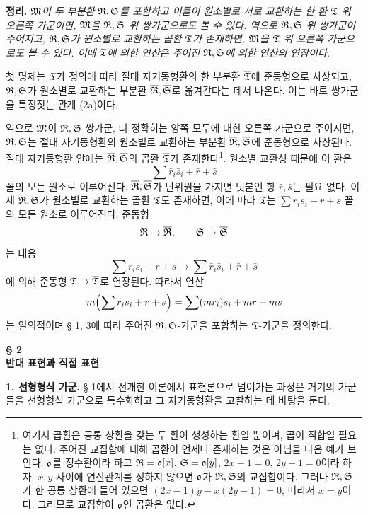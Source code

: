 \noindent\textbf{정리.} \emph{\(\mathfrak M\)이 두 부분환 \(\mathfrak R,\mathfrak S\)를 포함하고 이들이 원소별로 서로 교환하는 한 환 \(\mathfrak T\) 위 오른쪽 가군이면, \(\mathfrak M\)을 \(\mathfrak R,\mathfrak S\) 위 쌍가군으로도 볼 수 있다. 역으로 \(\mathfrak R,\mathfrak S\) 위 쌍가군이 주어지고, \(\mathfrak R,\mathfrak S\)가 원소별로 교환하는 곱환 \(\mathfrak T\)가 존재하면, \(\mathfrak M\)을 \(\mathfrak T\) 위 오른쪽 가군으로도 볼 수 있다. 이때 \(\mathfrak T\)에 의한 연산은 주어진 \(\mathfrak R,\mathfrak S\)에 의한 연산의 연장이다.}

첫 명제는 \(\mathfrak T\)가 정의에 따라 절대 자기동형환의 한 부분환 \(\overline{\mathfrak T}\)에 준동형으로 사상되고, \(\mathfrak R,\mathfrak S\)가 원소별로 교환하는 부분환 \(\overline{\mathfrak R},\overline{\mathfrak S}\)로 옮겨간다는 데서 나온다. 이는 바로 쌍가군을 특징짓는 관계 (2a)이다.

역으로 \(\mathfrak M\)이 \(\mathfrak R,\mathfrak S\)-쌍가군, 더 정확히는 양쪽 모두에 대한 오른쪽 가군으로 주어지면, \(\mathfrak R,\mathfrak S\)는 절대 자기동형환의 원소별로 교환하는 부분환 \(\overline{\mathfrak R},\overline{\mathfrak S}\)에 준동형으로 사상된다. 절대 자기동형환 안에는 \(\overline{\mathfrak R},\overline{\mathfrak S}\)의 곱환 \(\overline{\mathfrak T}\)가 존재한다\footnote{여기서 곱환은 공통 상환을 갖는 두 환이 생성하는 환일 뿐이며, 곱이 직합일 필요는 없다. 주어진 교집합에 대해 곱환이 언제나 존재하는 것은 아님을 다음 예가 보인다. \(\mathfrak o\)를 정수환이라 하고 \(\mathfrak R=\mathfrak o[x]\), \(\mathfrak S=\mathfrak o[y]\), \(2x-1=0\), \(2y-1=0\)이라 하자. \(x,y\) 사이에 연산관계를 정하지 않으면 \(\mathfrak o\)가 \(\mathfrak R,\mathfrak S\)의 교집합이다. 그러나 \(\mathfrak R,\mathfrak S\)가 한 공통 상환에 들어 있으면 \((2x-1)y-x(2y-1)=0\), 따라서 \(x=y\)이다. 그러므로 교집합이 \(\mathfrak o\)인 곱환은 없다.}. 원소별 교환성 때문에 이 환은
\[
\sum \bar r_i\bar s_i+\bar r+\bar s
\]
꼴의 모든 원소로 이루어진다. \(\overline{\mathfrak R},\overline{\mathfrak S}\)가 단위원을 가지면 덧붙인 항 \(\bar r,\bar s\)는 필요 없다. 이제 \(\mathfrak R,\mathfrak S\)가 원소별로 교환하는 곱환 \(\mathfrak T\)도 존재하면, 이에 따라 \(\mathfrak T\)는 \(\sum r_i s_i+r+s\) 꼴의 모든 원소로 이루어진다. 준동형
\[
\mathfrak R\to\overline{\mathfrak R},\qquad
\mathfrak S\to\overline{\mathfrak S}
\]
는 대응
\[
\sum r_i s_i+r+s
\longmapsto
\sum\bar r_i\bar s_i+\bar r+\bar s
\]
에 의해 준동형 \(\mathfrak T\to\overline{\mathfrak T}\)로 연장된다. 따라서 연산
\[
m\Bigl(\sum r_i s_i+r+s\Bigr)
=\sum(mr_i)s_i+mr+ms
\]
는 일의적이며 § 1, 3에 따라 주어진 \(\mathfrak R,\mathfrak S\)-가군을 포함하는 \(\mathfrak T\)-가군을 정의한다.

\begin{center}
\textbf{§ 2}\\[0.4em]
\textbf{반대 표현과 직접 표현}
\end{center}

\noindent\textbf{1. 선형형식 가군.} § 1에서 전개한 이론에서 표현론으로 넘어가는 과정은 거기의 가군들을 선형형식 가군으로 특수화하고 그 자기동형환을 고찰하는 데 바탕을 둔다.

